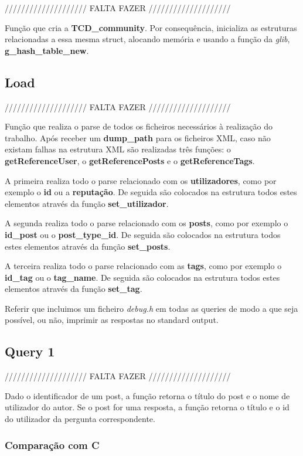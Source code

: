 \documentclass[a4paper]{article}
\begin{document}
//////////////////// FALTA FAZER ////////////////////

Função que cria a \textbf{TCD\_community}. Por consequência, inicializa
as estruturas relacionadas a essa mesma struct, alocando memória e usando
a função da \textit{glib}, \textbf{g\_hash\_table\_new}.

\subsection{Load}

//////////////////// FALTA FAZER ////////////////////

Função que realiza o parse de todos os ficheiros necessários à realização
do trabalho. Após receber um \textbf{dump\_path} para os ficheiros XML,
caso não existam falhas na estrutura XML são realizadas três funções:
o \textbf{getReferenceUser}, o \textbf{getReferencePosts} e o
\textbf{getReferenceTags}.

A primeira realiza todo o parse relacionado com os \textbf{utilizadores}, 
como por exemplo o \textbf{id} ou a \textbf{reputação}. De seguida são 
colocados na estrutura todos estes elementos através da função
\textbf{set\_utilizador}.

A segunda realiza todo o parse relacionado com os \textbf{posts}, 
como por exemplo o \textbf{id\_post} ou o \textbf{post\_type\_id}. 
De seguida são colocados na estrutura todos estes elementos através da 
função \textbf{set\_posts}.

A terceira realiza todo o parse relacionado com as \textbf{tags}, 
como por exemplo o \textbf{id\_tag} ou o \textbf{tag\_name}. 
De seguida são colocados na estrutura todos estes elementos através da 
função \textbf{set\_tag}.

Referir que incluimos um ficheiro \textit{debug.h} em todas as queries 
de modo a que seja possível, ou não, imprimir as respostas no 
standard output.

\subsection{Query 1}

//////////////////// FALTA FAZER ////////////////////

Dado o identificador de um post, a função retorna o título do post 
e o nome de utilizador do autor. Se o post for uma resposta, a função
retorna o título e o id do utilizador da pergunta correspondente.

\subsubsection{Comparação com C}
\end{document}
